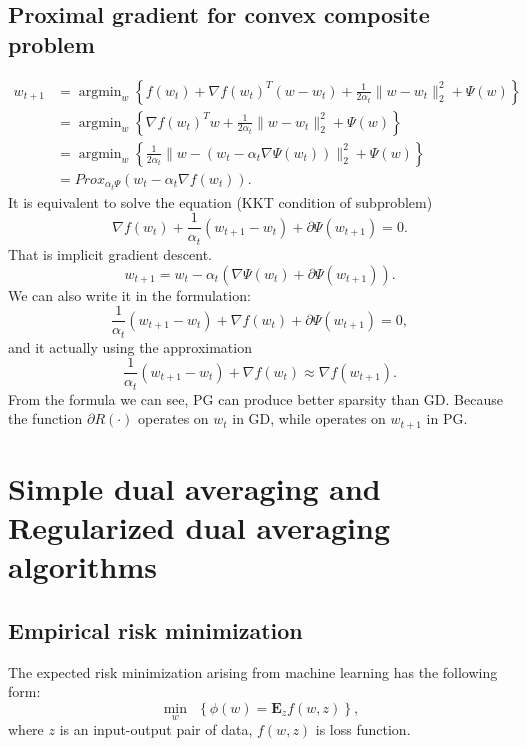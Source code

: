 \subsection{Proximal gradient for convex composite problem}
\begin{align}
	w_{t+1}&= \mathop{\arg \min}_w \left\lbrace f(w_t)+\nabla f(w_t)^T (w-w_t)+\frac{1}{2\alpha_t} \|w-w_t\|^2_2 +\Psi(w) \right \rbrace\\
	&=\mathop{\arg \min}_w \left\lbrace \nabla f(w_t)^T w+\frac{1}{2\alpha_t} \|w-w_t\|^2_2 +\Psi(w) \right \rbrace\\
	&=\mathop{\arg \min}_w \left\lbrace \frac{1}{2\alpha_t} \|w-(w_t-\alpha_t \nabla \Psi(w_t))\|^2_2 +\Psi(w) \right \rbrace\\
	&=Prox_{\alpha_t \Psi} (w_t-\alpha_t \nabla f(w_t)).
\end{align}
It is equivalent to solve the equation (KKT condition of subproblem)
\begin{equation}
	\nabla f(w_t) + \frac{1}{\alpha_t} (w_{t+1}-w_t) +\partial \Psi(w_{t+1}) = 0.
\end{equation}
That is implicit gradient descent.
\begin{equation}
	w_{t+1} = w_t -\alpha_t (\nabla \Psi(w_t) + \partial \Psi(w_{t+1})).
\end{equation}
We can also write it in the formulation:
\begin{equation}
	\frac{1}{\alpha_t} (w_{t+1}-w_t) +\nabla f(w_t) + \partial \Psi(w_{t+1})=0,
\end{equation}
and it actually using the approximation
\begin{equation}
	\frac{1}{\alpha_t} (w_{t+1}-w_t) +\nabla f(w_t) \approx \nabla f(w_{t+1}).
\end{equation}
From the formula we can see, PG can produce better sparsity than GD.
Because the function $\partial R(\cdot)$ operates on $w_t$ in GD, while operates on $w_{t+1}$ in PG.


\section{Simple dual averaging and Regularized dual averaging algorithms}

\subsection{Empirical risk minimization}
The expected risk minimization arising from machine learning has the following form:
\begin{equation}\label{expected risk minimization}
	\min_{w}~~\left\lbrace \phi(w)= \mathbf{E}_z f(w,z)\right\rbrace,
\end{equation}
where $z$ is an input-output pair of data, $f(w,z)$ is loss function.

